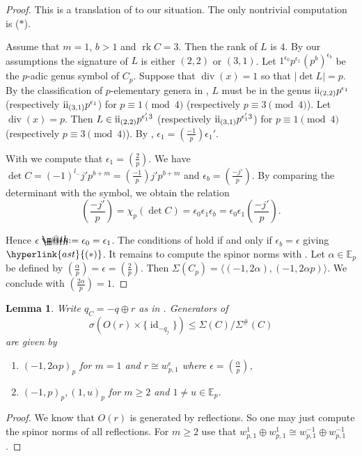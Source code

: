 \documentclass{amsart}
\makeatletter
\theoremstyle{definition}
\theoremstyle{plain}
\newtheorem{lemma}[definition]{Lemma}
\DeclareMathOperator{\rk}{rk}
\DeclareMathOperator{\id}{id}
\newcommand{\EE}{\mathbb{E}}
\newcommand{\RN}[1]{\textup{\uppercase\expandafter{\romannumeral#1}}}
\newcommand{\even}{\RN{2}}
\newcommand{\leg}[2]{\left( \frac{#1}{#2}\right)}
\newcommand*{\defeq}{\mathrel{\rlap{%
                     \raisebox{0.3ex}{$\m@th\cdot$}}%
                     \raisebox{-0.3ex}{$\m@th\cdot$}}%
                     =}
\renewcommand{\div}{\mathop{div}}
\newcommand{\condAst}{\hyperlink{ast}{(\ast)}}
\makeatother
\begin{document}
\begin{proof}
This is a translation of \cite[VII Thms.\ 12.5, 12.7, 12.9]{miranda_morrison:embeddings} to our situation.
The only nontrivial computation is ($\ast$).

Assume that
$m=1$, $b>1$ and $\rk C = 3$.
Then the rank of $L$ is $4$. By our assumptions the signature of $L$ is either $(2,2)$ or $(3,1)$.
Let $1^{\epsilon_0} p^{\epsilon_1} (p^b)^{\epsilon_b}$
be the $p$-adic genus symbol of $C_p$.
Suppose that $\div(x)=1$ so that $|\det L| = p$.
By the classification of $p$-elementary genera in ,
$L$ must be in the genus $\even_{(2,2)}p^{\epsilon_1}$
(respectively $\even_{(3,1)}p^{\epsilon_1}$)
for $p \equiv 1 \pmod 4$ (respectively $p \equiv 3 \pmod 4$).
Let $\div(x)=p$. Then
$L \in \even_{(2,2)}p^{\epsilon_1' 3}$ (respectively $\even_{(3,1)}p^{\epsilon_1' 3}$) for $p \equiv 1 \pmod 4$ (respectively $p \equiv 3 \pmod 4$). By , $\epsilon_1 = \leg{-1}{p} \epsilon_1'$.

With  we compute that $\epsilon_1 = \left(\tfrac{2}{p}\right)$.
We have $\det C = (-1)^{l_-}j' p^{b+m}= \left(\tfrac{-1}{p}\right) j' p^{b+m}$ and
$\epsilon_b = \left(\tfrac{-j'}{p}\right)$.
By comparing the determinant with the symbol, we obtain the relation
\begin{equation}\label{eqn:eps}
\left(\frac{-j'}{p}\right)=\chi_p(\det C)=\epsilon_0 \epsilon_1 \epsilon_b=\epsilon_0 \epsilon_1 \left(\frac{-j'}{p}\right).
\end{equation}

Hence $\epsilon \defeq \epsilon_0 = \epsilon_1$.
The conditions of \cite[VII Thm.\ 12.5]{miranda_morrison:embeddings} hold if and only if $\epsilon_b=\epsilon$ giving $\condAst$.
It remains to compute the spinor norms with \cite[VII Thms.\ 12.5, 12.9]{miranda_morrison:embeddings}.
Let $\alpha \in \EE_p$ be defined by $\left(\tfrac{\alpha}{p}\right)=\epsilon=\left(\tfrac{2}{p}\right)$.
Then $\Sigma(C_p) =\langle (-1,2\alpha),(-1,2 \alpha p)\rangle$. We conclude with $\left(\tfrac{2 \alpha}{p}\right)=1$.
\end{proof}
\begin{lemma}\label{lem:sigma-rq}
Write $q_C = -q \oplus r$ as in .
Generators of
\[
 \sigma\left(O(r)\times \{\id_{-q_j}\}\right) \leq \Sigma(C)/\Sigma^\#(C) \]
 are given by
 \begin{enumerate}
  \item $(-1,2\alpha p)_p$ for $m=1$ and $r \cong w_{p,1}^\epsilon$ where $\epsilon = \leg{\alpha}{p}$,
  \item $(-1,p)_p, (1,u )_p$ for $m \geq 2$ and $1 \neq u \in \EE_p$.
 \end{enumerate}
\end{lemma}
\begin{proof}
 We know that $O(r)$ is generated by reflections.
 So one may just compute the spinor norms of all reflections.
 For $m\geq 2$ use that $w_{p,1}^{1} \oplus w_{p,1}^{1} \cong w_{p,1}^{-1} \oplus w_{p,1}^{-1}$.
\end{proof}
\end{document}
